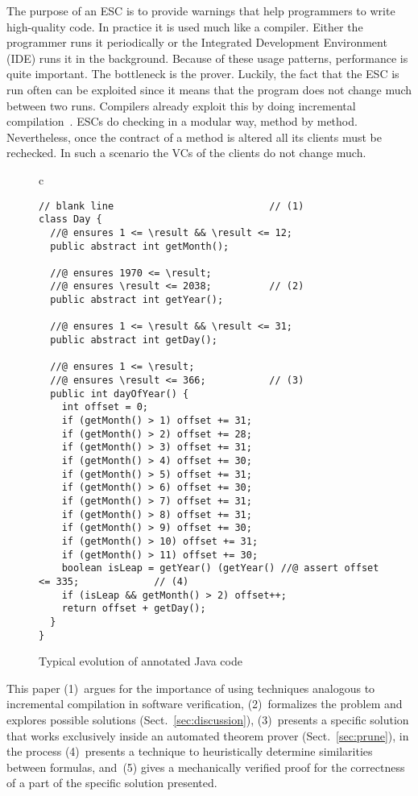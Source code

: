 \documentclass{llncs}
\begin{document}
The purpose of an ESC is to provide warnings that help programmers
to write high-quality code. In practice it is used much like a
compiler. Either the programmer runs it periodically or the
Integrated Development Environment (IDE) runs it in the 
background. Because of these usage patterns,
performance is quite important. The bottleneck is the prover. Luckily,
the fact that the ESC is run often can be exploited since it means that
the program does not change much between two runs. Compilers already
exploit this by doing incremental compilation~\cite{schwartz1984icm}. 
ESCs do checking in a modular way, method by method. Nevertheless, 
once the contract of a method is altered all its clients must be 
rechecked. In such a scenario the VCs of the clients do not 
change much.

\begin{figure}[th]
  \centering
\begin{tabular}{c} \begin{lstlisting}
// blank line                           // (1)
class Day {
  //@ ensures 1 <= \result && \result <= 12;
  public abstract int getMonth();

  //@ ensures 1970 <= \result;
  //@ ensures \result <= 2038; 			// (2)
  public abstract int getYear();

  //@ ensures 1 <= \result && \result <= 31;
  public abstract int getDay();

  //@ ensures 1 <= \result;
  //@ ensures \result <= 366; 			// (3)
  public int dayOfYear() {
    int offset = 0;
    if (getMonth() > 1) offset += 31;
    if (getMonth() > 2) offset += 28;
    if (getMonth() > 3) offset += 31;
    if (getMonth() > 4) offset += 30;
    if (getMonth() > 5) offset += 31;
    if (getMonth() > 6) offset += 30;
    if (getMonth() > 7) offset += 31;
    if (getMonth() > 8) offset += 31;
    if (getMonth() > 9) offset += 30;
    if (getMonth() > 10) offset += 31;
    if (getMonth() > 11) offset += 30;
    boolean isLeap = getYear() (getYear() //@ assert offset <= 335; 			// (4)
    if (isLeap && getMonth() > 2) offset++;
    return offset + getDay();
  }
}
\end{lstlisting}
\end{tabular}
  \caption{Typical evolution of annotated Java code}
  \label{fig:java_evol}
\end{figure}


This paper (1)~argues for the importance of using techniques 
analogous to incremental compilation in software verification,
(2)~formalizes the problem and explores possible solutions 
(Sect.~\ref{sec:discussion}), (3)~presents a specific solution
that works exclusively inside an automated theorem prover
(Sect.~\ref{sec:prune}), in the process (4)~presents a
technique to heuristically determine similarities between
formulas, and~(5) gives a mechanically verified proof
for the correctness of a part of the specific solution 
presented.
\end{document}

